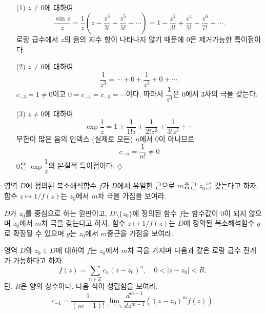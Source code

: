 \begin{salt_example}\label{example-4-16}
\
\begin{itemize}
\item[(1)] $z\ne0$에 대하여
\[
\dfrac{\sin z}z = \dfrac 1z\left( z - \dfrac{z^3}{3!} + \dfrac{z^5}{5!} - \cdots
\right) =1 - \dfrac{z^2}{3!} + \dfrac{z^4}{5!} - \dfrac{z^6}{7!} + \cdots.
\]
로랑 급수에서 $z$의 음의 지수 항이 나타나지 않기 때문에
$0$은 제거가능한 특이점이다.
\item[(2)] $z\ne0$에 대하여 
\[
\dfrac1{z^3} = \cdots + 0 + \dfrac1{z^3} + 0 + \cdots.
\]
$c_{-3}=1 \ne 0$이고 $0=c_{-4} = c_{-5} = \cdots$이다.
따라서 $\dfrac1{z^3}$은 $0$에서 $3$차의 극을 갖는다.
\item[(3)] $z\ne0$에 대하여 
\[
\exp \dfrac1z = 1 + \dfrac1{1!z} + \dfrac1{2!z^2} + \dfrac1{3!z^3} + \cdots
\]
무한이 많은 음의 인덱스 (실제로 모든) $n$에서 $0$이 아니므로
\[
c_{-n} = \dfrac1{n!} \ne 0
\]
$0$은 $\exp \dfrac1z$의 본질적 특이점이다.
\hfill $\diamondsuit$
\end{itemize}
\end{salt_example}

\begin{salt_exercise}\label{ex-4-30}
영역 $D$에 정의된 복소해석함수 $f$가 $D$에서 유일한 근으로
$m$중근 $z_0$를 갖는다고 하자.
함수 $z\mapsto 1/f(z)$는 $z_0$에서 $m$차 극을 가짐을 보여라.
\end{salt_exercise}

\begin{salt_exercise}\label{ex-4-31}
$D$가 $z_0$를 중심으로 하는 원판이고, 
$D\setminus \{z_0\}$에 정의된 함수 $f$는 함수값이 $0$이 되지 않으며
$z_0$에서 $m$차 극을 갖는다고 하자. 
함수 $z\mapsto 1/f(z)$는 $D$에 정의된 복소해석함수 $g$로 확장될 수 있으며
$g$는 $z_0$에서 $m$중근을 가짐을 보여라.
\end{salt_exercise}

\begin{salt_exercise}\label{ex-4-32}
영역 $D$와  $z_0\in D$에 대하여
$f$는 $z_0$에서 $m$차 극을 가지며 다음과 같은 로랑 급수 전개가 가능하다고 하자.
\[
f(z) = \sum_{n\in\mathbb Z} c_n(z-z_0)^n,\quad
0<|z-z_0|<R,
\]
단, $R$은 양의 상수이다. 다음 식이 성립함을 보여라.
\[
c_{-1} = \dfrac1{(m-1)!}\lim_{z\to z_0} \dfrac{d^{m-1}}{dz^{m-1}}
\left( (z-z_0)^m f(z) \right).
\]
\end{salt_exercise}

